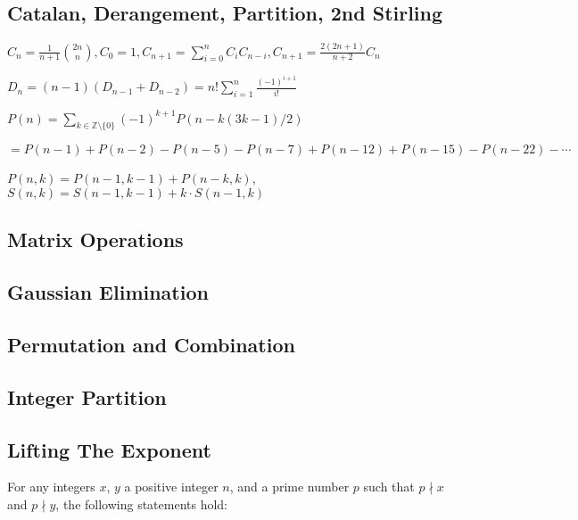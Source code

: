 \documentclass[9pt,landscape,a4paper,twocolumn]{extarticle}
\begin{document}
\subsection{Catalan, Derangement, Partition, 2nd Stirling}
$C_n = \frac{1}{n + 1} \binom{2n}{n}, C_0 = 1, C_{n + 1} = \sum_{i=0}^{n} C_i C_{n-i},  C_{n + 1} = \frac{2(2n+1)}{n+2} C_n$

$D_n = (n-1)(D_{n-1} + D_{n-2})=n! \sum_{i=1}^n \frac{(-1)^{i+1}}{i!}$

$ P(n) =\sum_{k \in \mathbb{Z}\setminus\{0\}}^{}
    (-1)^{k+1} P(n-k(3k-1)/2) $

$= P(n-1) + P(n-2)-P(n-5)-P(n-7) +P(n-12) +P(n-15) - P(n-22) -\cdots$

$P(n,k)=P(n-1,k-1)+P(n-k,k)$, $S(n,k)=S(n-1,k-1)+k\cdot S(n-1,k)$

\subsection{Matrix Operations}


\subsection{Gaussian Elimination}


\subsection{Permutation and Combination}



\subsection{Integer Partition}


\subsection{Lifting The Exponent}
For any integers $x$, $y$ a positive integer $n$, and a prime number $p$ such that $p \nmid x$ and $p \nmid y$, the following statements hold:
\end{document}
